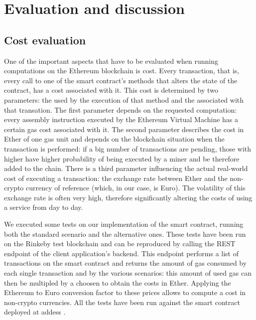 
\section{Evaluation and discussion}
\label{sect:evaluation-and-discussion}

\newcommand{\dappaddress}[0]{\code{0xd82429497c69208a358ece305efc7aba4b237fe2}}
\newcommand{\gaspricegwei}[0]{$17.011103191$ GWei }
\newcommand{\ethtoeur}[0]{$1 \text{ETH} = 537.257818083 \text{EUR}$}

\newcommand{\txmigrationsdepoly}[0]{\code{0x9449167b4dd3e9e3d3a4c4920de87c94db0e4c03b6be8e8d42991a6aa6ff9121}}
\newcommand{\txupdatemiga}[0]{\code{0x66ffefb48f188c02334eeaeb15bcd65a9237118d6fcfdc95ff6e791806426eee}}
\newcommand{\txmaindeploy}[0]{\code{0x64a94e73a84e716ab4b27947ff2b1c3c44ae86e22e48ca3e7314f8864c2093b1}}
\newcommand{\txupdatemigb}[0]{\code{0xde1f4e7590972b5bc4caa1a2c84019d0959be22d756a145f671f1882357c4a19}}

\subsection{Cost evaluation}
One of the important aspects that have to be evaluated when running computations on the Ethereum blockchain is cost. Every transaction, that is, every call to one of the smart contract's methods that alters the state of the contract, has a cost associated with it. This cost is determined by two parameters: the  used by the execution of that method and the  associated with that transation. The first parameter depends on the requested computation: every assembly instruction executed by the Ethereum Virtual Machine has a certain gas cost associated with it. The second parameter describes the cost in Ether of one gas unit and depends on the blockchain situation when the transaction is performed: if a big number of transactions are pending, those with higher  have higher probability of being executed by a miner and be therefore added to the chain.
There is a third parameter influencing the actual real-world cost of executing a transaction: the exchange rate between Ether and the non-crypto currency of reference (which, in our case, is Euro). The volatility of this exchange rate is often very high, therefore significantly altering the costs of using a service from day to day. 

We executed some tests on our implementation of the smart contract, running both the standard scenario and the alternative ones. These tests have been run on the Rinkeby test blockchain and can be reproduced by calling the  REST endpoint of the client application's backend. This endpoint performs a list of transactions on the smart contract and returns the amount of gas consumed by each single transaction and by the various scenarios: this amount of used gas can then be multipled by a choosen  to obtain the costs in Ether. Applying the Ethereum to Euro conversion factor to these prices allows to compute a cost in non-crypto currencies. All the tests have been run against the smart contract deployed at addess \dappaddress.

